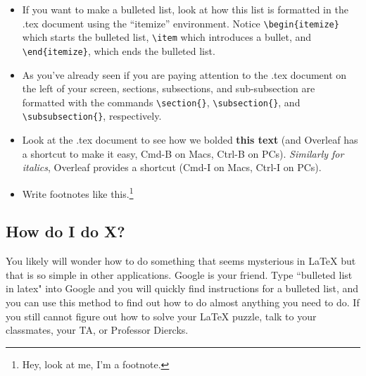 \documentclass[output=paper,colorlinks,citecolor=brown]{langscibook}
\begin{document}
\begin{itemize}

\item If you want to make a bulleted list, look at how this list is formatted in the .tex document using the ``itemize'' environment. Notice \verb|\begin{itemize}| which starts the bulleted list, \verb|\item| which introduces a bullet, and \verb|\end{itemize}|, which ends the bulleted list.

\item As you've already seen if you are paying attention to the .tex document on the left of your screen, sections, subsections, and sub-subsection are formatted with the commands \verb|\section{}|, \verb|\subsection{}|, and \verb|\subsubsection{}|, respectively.

\item Look at the .tex document to see how we bolded \textbf{this text} (and Overleaf has a shortcut to make it easy, Cmd-B on Macs, Ctrl-B on PCs). \textit{Similarly for italics}, Overleaf provides a shortcut (Cmd-I on Macs, Ctrl-I on PCs).

\item Write footnotes like this.\footnote{Hey, look at me, I'm a footnote.}

\end{itemize}

\subsection{How do I do X?}

You likely will wonder how to do something that seems mysterious in \LaTeX{} but that is so simple in other applications. Google is your friend. Type ``bulleted list in latex" into Google and you will quickly find instructions for a bulleted list, and you can use this method to find out how to do almost anything you need to do. If you still cannot figure out how to solve your \LaTeX{} puzzle, talk to your classmates, your TA, or Professor Diercks.  
\end{document}
